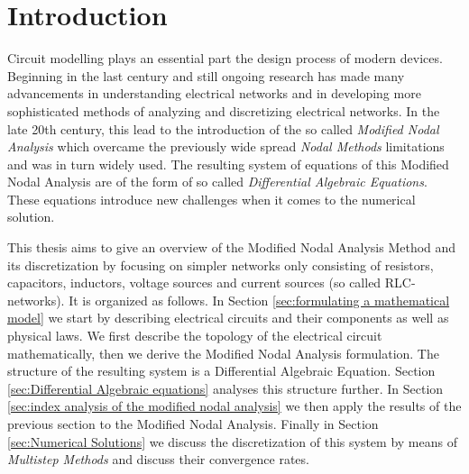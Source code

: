 \chapter{Introduction}

	Circuit modelling plays an essential part the design process of modern devices. Beginning in the last century and still ongoing research has made many advancements in understanding electrical networks and in developing more sophisticated methods of analyzing and discretizing electrical networks. In the late 20th century, this lead to the introduction of the so called \emph{Modified Nodal Analysis} which overcame the previously wide spread \emph{Nodal Methods} limitations and was in turn widely used. The resulting system of equations of this Modified Nodal Analysis are of the form of so called \emph{Differential Algebraic Equations}. These equations introduce new challenges when it comes to the numerical solution. 
	
	This thesis aims to give an overview of the Modified Nodal Analysis Method and its discretization by focusing on simpler networks only consisting of resistors, capacitors, inductors, voltage sources and current sources (so called RLC-networks). It is organized as follows. In Section \ref{sec:formulating a mathematical model} we start by describing electrical circuits and their components as well as physical laws. We first describe the topology of the electrical circuit mathematically, then we derive the Modified Nodal Analysis formulation. The structure of the resulting system is a Differential Algebraic Equation. Section \ref{sec:Differential Algebraic equations} analyses this structure further. In Section \ref{sec:index analysis of the modified nodal analysis} we then apply the results of the previous section to the Modified Nodal Analysis. Finally in Section \ref{sec:Numerical Solutions} we discuss the discretization of this system by means of \emph{Multistep Methods} and discuss their convergence rates.
